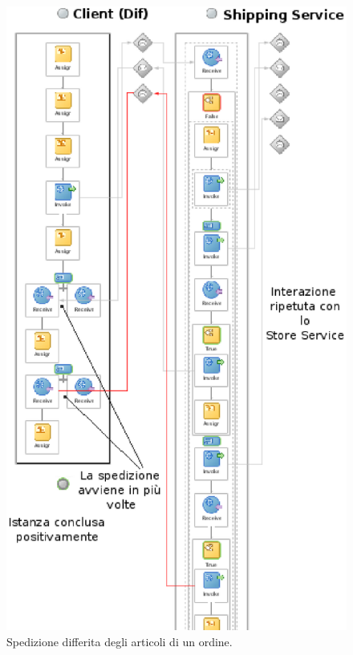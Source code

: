\begin{figure}[p]
\begin{center}
  \includegraphics[scale=1,clip]{blide/dia/Sim3}
   \caption[Blide, simulazione 3]{Spedizione differita degli articoli
   di un ordine.}
  \label{fig:Sim3}
\end{center}
\end{figure}

